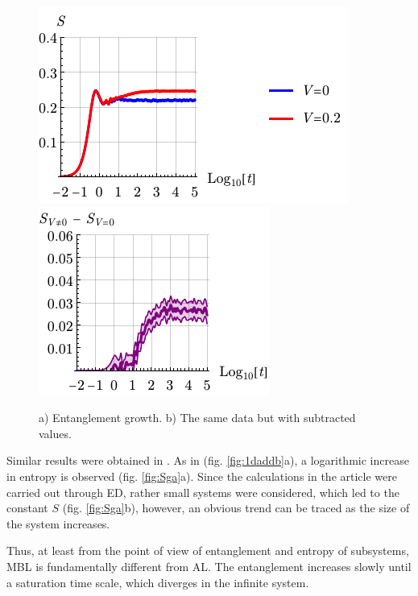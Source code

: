 \begin{figure}[h]
    \centering
     \hspace{2 mm} 
    \includegraphics[align=c]{imgs/S_FV1.pdf}
    \hspace{10 mm} 
     \hspace{2 mm} 
    \includegraphics[align=c]{imgs/S_FV2.pdf}
    \caption{a) Entanglement growth. b) The same data but with subtracted values.}
    \label{fig:Sg}
\end{figure}


Similar results were obtained in \cite{bardarson_unbounded_2012}. As in \cite{schreiber_observation_2015} (fig. \ref{fig:1daddb}a), a logarithmic increase in entropy is observed (fig. \ref{fig:Sga}a). Since the calculations in the article were carried out through ED, rather small systems were considered, which led to the constant $S$ (fig. \ref{fig:Sga}b), however, an obvious trend can be traced as the size of the system increases.



Thus, at least from the point of view of entanglement and entropy of subsystems, MBL is fundamentally different from AL. The entanglement increases slowly until a saturation time scale, which diverges in the infinite system. 



